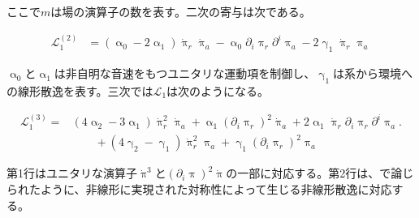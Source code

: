 \documentclass[a4paper,11pt]{ltjsarticle}
\numberwithin{equation}{section}
\begin{document}
ここで$m$は場の演算子の数を表す。二次の寄与は次である。

\begin{align}
        \mathcal{L}_1^{(2)} &= \left( \upalpha_0 -2 \upalpha_1\right) \dot{\uppi}_{r} \dot{\uppi}_{a} - \upalpha_0 \partial_i \uppi_{r}  \partial^i \uppi_{a} - 2 \upgamma_1  \dot{\uppi}_{r} \uppi_a
    \end{align}

$\upalpha_0$と$\upalpha_1$は非自明な音速をもつユニタリな運動項を制御し、$\upgamma_1$は系から環境への線形散逸を表す。三次では$\mathcal{L}_1$は次のようになる。

\begin{align}\label{eq:cubicinter}
        \mathcal{L}_1^{(3)} =  &\left(4 \upalpha_2 -3\upalpha_1 \right) \dot{\uppi}^2_{r} \dot{\uppi}_{a} + \upalpha_1 \left(\partial_i \uppi_{r} \right)^2 \dot{\uppi}_a + 2 \upalpha_1  \dot{\uppi}_{r}	\partial_i \uppi_{r}  \partial^i \uppi_{a} \Big.\nonumber \\
        &\qquad + \left(4 \upgamma_2 -\upgamma_1 \right)  \dot{\uppi}^2_{r} \uppi_{a}	+ \upgamma_1 	\left(\partial_i \uppi_{r} \right)^2 \uppi_a 
    \end{align}

第1行はユニタリな演算子$\dot{\uppi}^3$と$(\partial_i\uppi)^2\dot{\uppi}$の一部に対応する。第2行は、\cite{LopezNacir:2011kk}で論じられたように、非線形に実現された対称性によって生じる非線形散逸に対応する。
\end{document}
